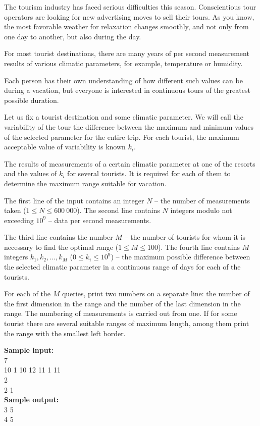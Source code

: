 \documentclass[a4paper]{article}
\begin{document}
The tourism industry has faced serious difficulties this season. Conscientious tour operators are looking for new advertising moves to sell their tours. As you know, the most favorable weather for relaxation changes smoothly, and not only from one day to another, but also during the day. 

For most tourist destinations, there are many years of per second measurement results of various climatic parameters, for example, temperature or humidity. 

Each person has their own understanding of how different such values can be during a vacation, but everyone is interested in continuous tours of the greatest possible duration.

Let us fix a tourist destination and some climatic parameter. We will call the variability of the tour the difference between the maximum and minimum values of the selected parameter for the entire trip. For each tourist, the maximum acceptable value of variability is known $k_i$. 

The results of measurements of a certain climatic parameter at one of the resorts and the values of $k_i$ for several tourists. It is required for each of them to determine the maximum range suitable for vacation.

The first line of the input contains an integer $N$ -- the number of measurements taken ($1 \le N \le 600 \ 000$). The second line contains $N$ integers modulo not exceeding $10^ 9$ -- data per second measurements.

The third line contains the number $M$ -- the number of tourists for whom it is necessary to find the optimal range ($1 \le M \le 100$). The fourth line contains $M$ integers $k_1, k_2, \ldots, k_M$ ($0 \le k_i \le 10^9$) -- the maximum possible difference between the selected climatic parameter in a continuous range of days for each of the tourists.

For each of the $M$ queries, print two numbers on a separate line: the number of the first dimension in the range and the number of the last dimension in the range. The numbering of measurements is carried out from one. If for some tourist there are several suitable ranges of maximum length, among them print the range with the smallest left border.

\LINE

\noindent \textbf{Sample input:}\\
7\\
10 1 10 12 11 1 11\\
2\\
2 1\\

\noindent \textbf{Sample output:}\\
3 5\\
4 5\\
\end{document}
